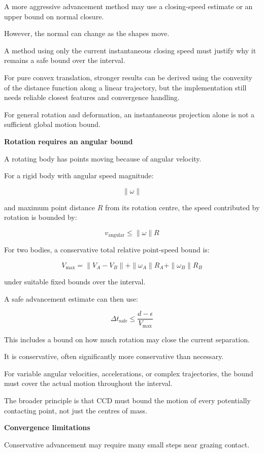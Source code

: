 A more aggressive advancement method may use a closing-speed estimate or an upper bound on normal closure.

However, the normal can change as the shapes move.

A method using only the current instantaneous closing speed must justify why it remains a safe bound over the interval.

For pure convex translation, stronger results can be derived using the convexity of the distance function along a linear trajectory, but the implementation still needs reliable closest features and convergence handling.

For general rotation and deformation, an instantaneous projection alone is not a sufficient global motion bound.

\textbf{Rotation requires an angular bound}

A rotating body has points moving because of angular velocity.

For a rigid body with angular speed magnitude:

\[
\|\omega\|
\]

and maximum point distance \(R\) from its rotation centre, the speed contributed by rotation is bounded by:

\[
\boxed{ v_{\mathrm{angular}}\le\|\omega\|R }
\]

For two bodies, a conservative total relative point-speed bound is:

\[
\boxed{ V_{\max} = \|V_A-V_B\| + \|\omega_A\|R_A + \|\omega_B\|R_B }
\]

under suitable fixed bounds over the interval.

A safe advancement estimate can then use:

\[
\boxed{ \Delta t_{\mathrm{safe}} \le \frac{d-\epsilon}{V_{\max}} }
\]

This includes a bound on how much rotation may close the current separation.

It is conservative, often significantly more conservative than necessary.

For variable angular velocities, accelerations, or complex trajectories, the bound must cover the actual motion throughout the interval.

The broader principle is that CCD must bound the motion of every potentially contacting point, not just the centres of mass.

\textbf{Convergence limitations}

Conservative advancement may require many small steps near grazing contact.

